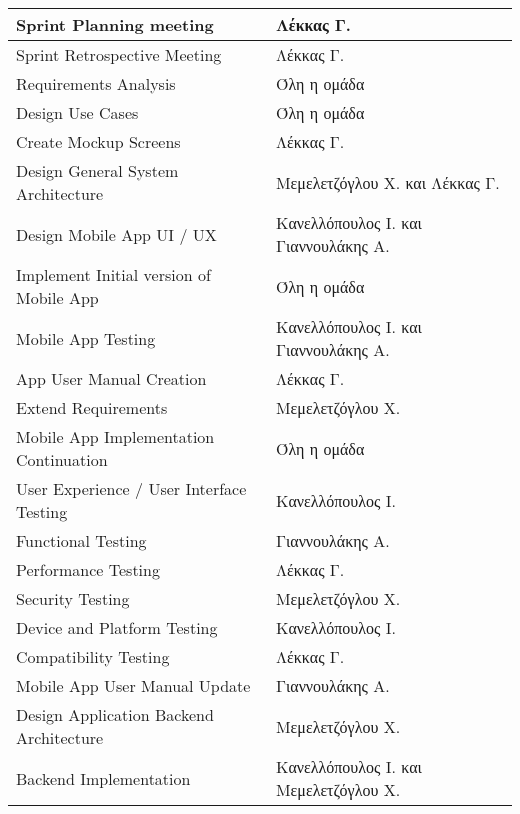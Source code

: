 \documentclass{../ol-softwaremanual}
\begin{document}
	
	\begin{longtable}{| p{} | p{} |} 
			\hline
			\en Sprint Planning meeting \gr & Λέκκας Γ. \\ 
			\hline
			\en Sprint Retrospective Meeting \gr & Λέκκας Γ.    \\ 
			\hline
			\en Requirements Analysis \gr & Όλη η ομάδα    \\ 
			\hline
			\en Design Use Cases \gr    &      Όλη η ομάδα     \\
			\hline
			\en Create Mockup Screens  \gr      &   Λέκκας Γ.        \\
			\hline
			\en Design General System Architecture \gr       &  Μεμελετζόγλου Χ. και Λέκκας Γ.         \\
			\hline
			\en Design Mobile App UI / UX \gr       &  Κανελλόπουλος Ι. και Γιαννουλάκης Α.         \\
			\hline
			\en Implement Initial version of Mobile App \gr       &  Όλη η ομάδα         \\
			\hline
			\en Mobile App Testing \gr       &  Κανελλόπουλος Ι. και Γιαννουλάκης Α.         \\
			\hline
			\en App User Manual Creation \gr       &  Λέκκας Γ.         \\
			\hline
			\en Extend Requirements \gr       &  Μεμελετζόγλου Χ.         \\
			\hline
			\en Mobile App Implementation Continuation \gr       &  Όλη η ομάδα         \\
			\hline
			\en User Experience / User Interface Testing \gr       &  Κανελλόπουλος Ι.         \\
			\hline
			\en Functional Testing \gr       &  Γιαννουλάκης Α.         \\
			\hline
			\en Performance Testing \gr       &  Λέκκας Γ.         \\
			\hline
			\en Security Testing \gr       &  Μεμελετζόγλου Χ.         \\
			\hline
			\en Device and Platform Testing \gr       &  Κανελλόπουλος Ι.         \\
			\hline
			\en Compatibility Testing \gr       &  Λέκκας Γ.         \\
			\hline
			\en Mobile App User Manual Update \gr       &  Γιαννουλάκης Α.         \\
			\hline
			\en Design Application Backend Architecture \gr       & Μεμελετζόγλου Χ.         \\
			\hline
			\en Backend Implementation \gr       &  Κανελλόπουλος Ι. και Μεμελετζόγλου Χ.         \\

\end{longtable}
\end{document}
